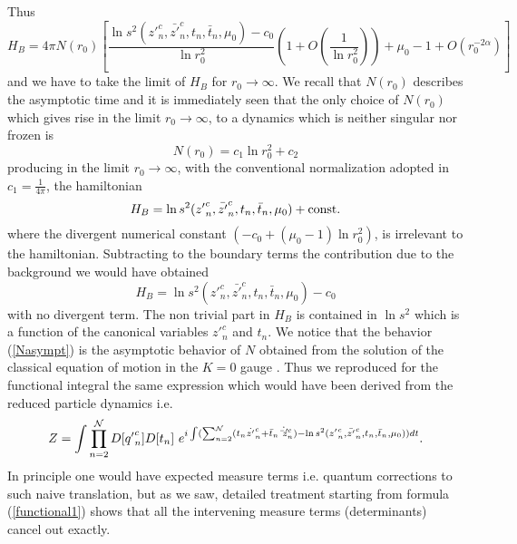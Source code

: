 \documentclass[a4paper,12pt]{article}
\begin{document}
Thus 
\begin{equation}
H_B=4\pi N(r_0)\left[\frac{\ln s^2({z'}^c_n,\bar{z'}^c_n, t_n,\bar
t_n,\mu_0)-c_0}{\ln
r^2_0}\left(1+O(\frac{1}{\ln r^2_0})\right)+\mu_0-1
+O(r_0^{-2\alpha})\right] 
\end{equation}
and we have to take the limit of $H_B$ for $r_0\rightarrow \infty$. We
recall that $N(r_0)$ describes the asymptotic time and it is
immediately seen that the only choice of $N(r_0)$ which gives rise in
the limit $r_0\rightarrow \infty$, to a dynamics which is neither
singular nor frozen is 
\begin{equation}\label{Nasympt}
N(r_0)=c_1\ln r^2_0 +c_2
\end{equation}
producing  in the limit $r_0\rightarrow\infty$, with
the conventional normalization adopted in \cite{CMS1}
$c_1=\frac{1}{4\pi}$, the hamiltonian 
\begin{equation}
H_B = \ln s^2({z'}^c_n,\bar{z'}^c_n, t_n,\bar t_n,\mu_0) + {\rm const.}
\end{equation}
where the divergent numerical constant $( -c_0 +
(\mu_0-1)\ln r_0^2)$, is irrelevant to the hamiltonian. Subtracting to
the boundary terms the contribution due to the background we would
have obtained
\begin{equation}
H_B = \ln s^2({z'}^c_n,\bar{z'}^c_n, t_n,\bar t_n,\mu_0) - c_0
\end{equation}
with no divergent term. 
The non trivial part in $H_B$ is contained in $\ln s^2$ which is a
function of the canonical variables ${z'}_n^c$ and $t_n$. 
We notice that the behavior (\ref{Nasympt}) is the asymptotic
behavior of $N$ 
obtained from the solution of the classical equation of motion in
the $K=0$ gauge \cite{CMS1}. Thus we reproduced for the functional
integral the 
same expression which would have been derived from the reduced
particle dynamics i.e.
\begin{equation}\label{reduced2}
Z=\int \prod_{n=2}^{\cal N}D[{q'}^c_n]D[t_n]~e^{i\int (\sum_{n=2}^{\cal
N}(t_n\dot {z'}^c_n + \bar t_n \dot{\bar z'}^c_n) - 
\ln s^2({z'}^c_n,\bar{z'}^c_n, t_n,\bar t_n,\mu_0))dt}.  
\end{equation}
In principle one would have expected measure terms
i.e. quantum corrections to such naive translation, but as we saw,
detailed treatment starting from formula (\ref{functional1}) shows
that all the 
intervening measure terms (determinants) cancel out exactly.
\end{document}
